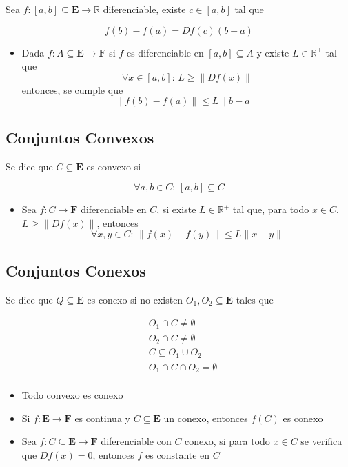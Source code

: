 Sea $f:[a,b]\subseteq\mathbf{E}\to\mathbb{R}$ diferenciable, existe $c\in [a, b]$ tal que

\[f(b)-f(a) = Df(c)(b-a)\]
\bigbreak

\begin{itemize}
    \item Dada $f:A\subseteq\mathbf{E}\to\mathbf{F}$ si $f$ es diferenciable en $[a,b]\subseteq A$ y existe $L\in\mathbb{R}^+$ tal que
    \[\forall x\in [a,b]:\,L\geq \|Df(x)\|\]
    entonces, se cumple que
    \[\|f(b)-f(a)\|\leq L\|b-a\|\]
\end{itemize}

\subsection{Conjuntos Convexos}

Se dice que $C\subseteq\mathbf{E}$ es convexo si

\[\forall a,b \in C:\,[a,b]\subseteq C\]
\bigbreak
\begin{itemize}
    \item Sea $f:C\to\mathbf{F}$ diferenciable en $C$, si existe $L\in\mathbb{R}^+$ tal que, para todo $x\in C$, $L\geq\|Df(x)\|$, entonces
    \[\forall x,y\in C:\,\|f(x)-f(y)\|\leq L\|x-y\|\]
\end{itemize}

\subsection{Conjuntos Conexos}

Se dice que $Q\subseteq\mathbf{E}$ es conexo si no existen $O_1,O_2\subseteq\mathbf{E}$ tales que

\begin{equation}
\begin{split}
    & O_1 \cap C \neq \emptyset\\
    & O_2 \cap C \neq \emptyset\\
    & C \subseteq O_1 \cup O_2\\
    & O_1 \cap C \cap O_2 = \emptyset\\
\end{split}
\nonumber
\end{equation}

\begin{itemize}
    \item Todo convexo es conexo
    \item Si $f:\mathbf{E}\to\mathbf{F}$ es continua y $C\subseteq\mathbf{E}$ un conexo, entonces $f(C)$ es conexo
    \item Sea $f:C\subseteq\mathbf{E}\to\mathbf{F}$ diferenciable con $C$ conexo, si para todo $x\in C$ se verifica que $Df(x)=0$, entonces $f$ es constante en $C$
\end{itemize}

